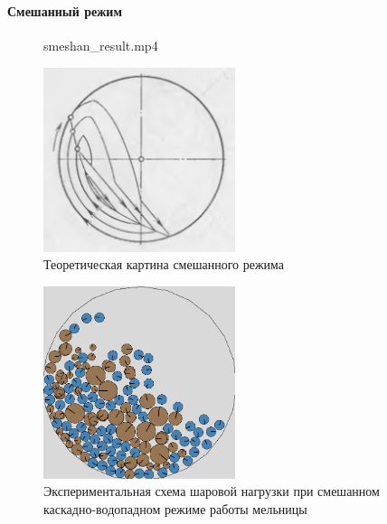 \documentclass[c]{beamer}  %
\begin{document}
\begin{frame}
\frametitle{\insertsection} 
\framesubtitle{Смешанный режим}

\begin{figure}[ht]
     		{smeshan_result.mp4}
\end{figure}
{
\begin{figure}[H]
	\centering
	\includegraphics[width=0.5\textwidth]{smeshan_theory} 
	\caption{Теоретическая картина смешанного режима}
\end{figure}
}
{
\begin{figure}[H]
	\centering
	\includegraphics[width=0.5\textwidth]{smeshan_result} 
	\caption{Экспериментальная схема шаровой нагрузки при смешанном каскадно-водопадном режиме работы мельницы}
	\label{pic:smeshan_result}
\end{figure} 
}
{

}
\end{frame}
\end{document}

